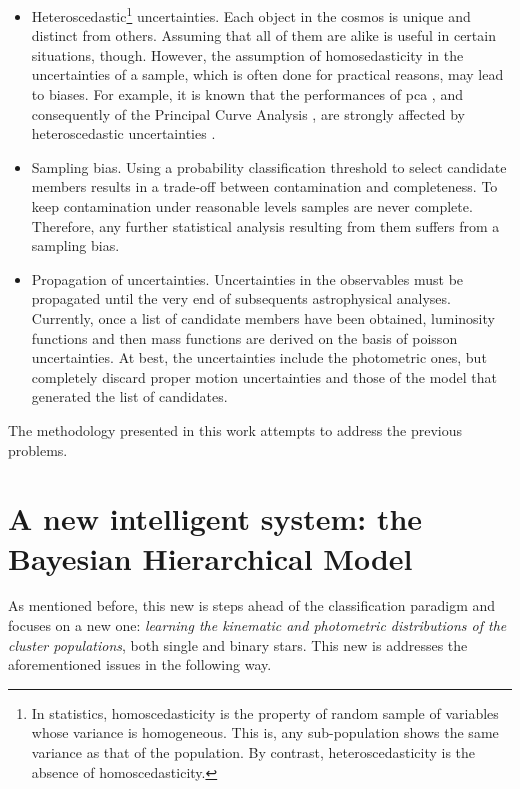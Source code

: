 \begin{itemize}
\item Heteroscedastic\footnote{In statistics, homoscedasticity is the property of random sample of variables whose variance is homogeneous. This is, any sub-population shows the same variance as that of the population. By contrast, heteroscedasticity is the absence of homoscedasticity.} uncertainties. Each object in the cosmos is unique and distinct from others. Assuming that all of them are alike is useful in certain situations, though. However, the assumption of homosedasticity in the uncertainties of a sample, which is often done for practical reasons, may lead to biases. For example, it is known that the performances of \gls{pca} \cite[used by][]{KroneMartins2014}, and consequently of the Principal Curve Analysis \cite[used by][]{Sarro2014}, are strongly affected by heteroscedastic uncertainties \citep{Hong2016}. 
\item Sampling bias. Using a probability classification threshold to select candidate members results in a trade-off between contamination and completeness. To keep contamination under reasonable levels samples are never complete. Therefore, any further statistical analysis resulting from them suffers from a sampling bias.
\item Propagation of uncertainties. Uncertainties in the observables must be propagated until the very end of subsequents astrophysical analyses. Currently, once a list of candidate members have been obtained, luminosity functions and then mass functions are derived on the basis of poisson uncertainties. At best, the uncertainties include the photometric ones, but completely discard proper motion uncertainties and those of the model that generated the list of candidates.
\end{itemize}

The methodology presented in this work attempts to address the previous problems.

\section{A new intelligent system: the Bayesian Hierarchical Model}
\label{sect:newIS}

As mentioned before, this new \gls{is} steps ahead of the classification paradigm and focuses on a new one: \textit{learning the kinematic and photometric distributions of the cluster populations}, both single and binary stars. This new \gls{is} addresses the aforementioned issues in the following way.

